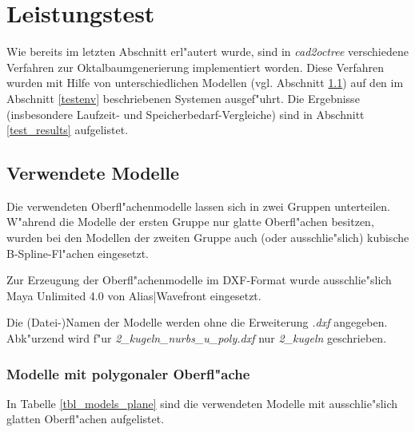 %
%   

\section{Leistungstest}
\label{leistungstest}
Wie bereits im letzten Abschnitt erl"autert wurde, sind in \emph{cad2octree} 
verschiedene Verfahren zur Oktalbaumgenerierung implementiert worden. 
Diese Verfahren wurden mit Hilfe von unterschiedlichen Modellen (vgl. 
Abschnitt \ref{models}) auf den im Abschnitt \ref{testenv} beschriebenen 
Systemen ausgef"uhrt. Die Ergebnisse (insbesondere Laufzeit- und 
Speicherbedarf-Vergleiche) sind in Abschnitt \ref{test_results} aufgelistet. 

\subsection{Verwendete Modelle}
\label{models}
Die verwendeten Oberfl"achenmodelle lassen sich in zwei Gruppen unterteilen. 
W"ahrend die Modelle der ersten Gruppe nur glatte Oberfl"achen besitzen, 
wurden bei den Modellen der zweiten Gruppe auch (oder ausschlie"slich) 
kubische B-Spline-Fl"achen eingesetzt. 

Zur Erzeugung der Oberfl"achenmodelle im DXF-Format wurde ausschlie"slich 
Maya Unlimited 4.0 von Alias|Wavefront 
eingesetzt. 

Die (Datei-)Namen der Modelle werden ohne die Erweiterung \emph{.dxf} 
angegeben. Abk"urzend wird f"ur \emph{2\_kugeln\_nurbs\_u\_poly.dxf} nur 
\emph{2\_kugeln} geschrieben. 

\subsubsection{Modelle mit polygonaler Oberfl"ache}
\label{models_plane}
In Tabelle \ref{tbl_models_plane} sind die verwendeten Modelle mit 
ausschlie"slich glatten Oberfl"achen aufgelistet.

